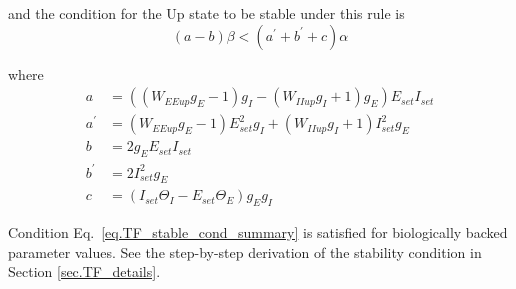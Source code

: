 \documentclass[
twocolumn,
]{article}
\newcommand{\EE}{\mathit{EE}}
\newcommand{\EI}{\mathit{EI}}
\newcommand{\IE}{\mathit{IE}}
\newcommand{\II}{\mathit{II}}
\newcommand{\set}{\mathit{set}}
\newcommand{\up}{\mathit{up}}
\begin{document}
\noindent and the condition for the Up state to be stable under this rule is
\begin{equation}
(a - b)\beta < (a^\prime + b^\prime + c) \alpha
\label{eq.TF_stable_cond_summary}
\end{equation}

\noindent where
\begin{displaymath}
\begin{aligned}
a & = ((W_{\EE\up}g_E - 1) g_I - (W_{\II\up}g_I + 1) g_E) E_{\set} I_{\set} \\
a^\prime & = (W_{\EE\up}g_E - 1)E_{\set}^2 g_I + (W_{\II\up}g_I + 1)I_{\set}^2 g_E \\
b & = 2g_E E_{\set} I_{\set} \\
b^\prime & = 2I_{\set}^2 g_E \\
c & = (I_{\set}\Theta_I - E_{\set}\Theta_E)g_E g_I
\end{aligned}
\end{displaymath}

\noindent Condition Eq.\ \ref{eq.TF_stable_cond_summary} is satisfied for biologically backed parameter values. See the step-by-step derivation of the stability condition in Section \ref{sec.TF_details}.




\end{document}
